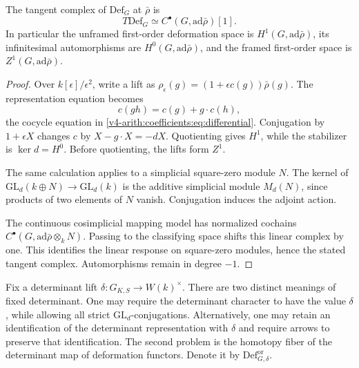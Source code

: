 \begin{proposition}\label{v4-arith:coefficients:prop:tangent}
The tangent complex of \(\mathrm{Def}_G\) at \(\bar\rho\) is
\[
 T\mathrm{Def}_G\simeq C^\bullet(G,\mathrm{ad}\bar\rho)[1].
\]
In particular the unframed first-order deformation space is
\(H^1(G,\mathrm{ad}\bar\rho)\), its infinitesimal automorphisms are
\(H^0(G,\mathrm{ad}\bar\rho)\), and the framed first-order space is
\(Z^1(G,\mathrm{ad}\bar\rho)\).
\end{proposition}
\begin{proof}
Over \(k[\epsilon]/\epsilon^2\), write a lift as
\(\rho_\epsilon(g)=(1+\epsilon c(g))\bar\rho(g)\).
The representation equation becomes
\[
 c(gh)=c(g)+g\cdot c(h),
\]
the cocycle equation in
\eqref{v4-arith:coefficients:eq:differential}.
Conjugation by \(1+\epsilon X\) changes \(c\) by
\(X-g\cdot X=-dX\). Quotienting gives \(H^1\), while the
stabilizer is \(\ker d=H^0\). Before quotienting, the lifts form
\(Z^1\).

The same calculation applies to a simplicial square-zero module \(N\).
The kernel of
\(\mathrm{GL}_d(k\oplus N)\to\mathrm{GL}_d(k)\) is the additive
simplicial module \(M_d(N)\), since products of two elements of
\(N\) vanish. Conjugation induces the adjoint action.

The continuous cosimplicial mapping model has normalized cochains
\(C^\bullet(G,\mathrm{ad}\bar\rho\otimes_k N)\).
Passing to the classifying space shifts this linear complex by one.
This identifies the linear response on square-zero modules, hence
the stated tangent complex. Automorphisms remain in degree \(-1\).
\end{proof}

Fix a determinant lift \(\delta:G_{K,S}\to W(k)^\times\).
There are two distinct meanings of fixed determinant. One may require
the determinant character to have the value \(\delta\), while allowing
all strict \(\mathrm{GL}_d\)-conjugations. Alternatively, one may retain
an identification of the determinant representation with \(\delta\)
and require arrows to preserve that identification. The second problem
is the homotopy fiber of the determinant map of deformation functors.
Denote it by \(\mathrm{Def}_{G,\delta}^{\mathrm{or}}\).

